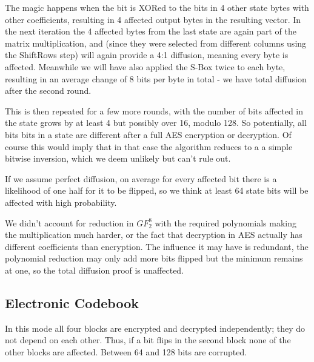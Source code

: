 \documentclass{article}
\begin{document}
The magic happens when the bit is XORed to the bits in 4 other state bytes with other coefficients, resulting in 4 affected output bytes in the resulting vector.
In the next iteration the 4 affected bytes from the last state are again part of the matrix multiplication, and (since they were selected from different columns using the ShiftRows step) will again provide a 4:1 diffusion, meaning every byte is affected.
Meanwhile we will have also applied the S-Box twice to each byte, resulting in an average change of 8 bits per byte in total - we have total diffusion after the second round.

This is then repeated for a few more rounds, with the number of bits affected in the state grows by at least 4 but possibly over 16, modulo 128.
So potentially, all bits bits in a state are different after a full AES encryption or decryption.
Of course this would imply that in that case the algorithm reduces to a a simple bitwise inversion, which we deem unlikely but can't rule out.

If we assume perfect diffusion, on average for every affected bit there is a likelihood of one half for it to be flipped, so we think at least 64 state bits will be affected with high probability.

We didn't account for reduction in $GF_2^8$ with the required polynomials making the multiplication much harder, or the fact that decryption in AES actually has different coefficients than encryption.
The influence it may have is redundant, the polynomial reduction may only add more bits flipped but the minimum remains at one, so the total diffusion proof is unaffected.


\subsection{Electronic Codebook}
In this mode all four blocks are encrypted and decrypted independently; they do not depend on each other.
Thus, if a bit flips in the second block none of the other blocks are affected.
Between 64 and 128 bits are corrupted.

\end{document}
